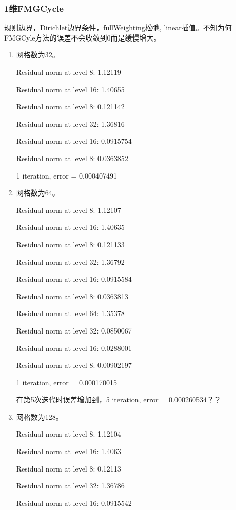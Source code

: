 \documentclass[UTF8]{ctexart}
\begin{document}
\subsubsection*{1维FMGCycle}
规则边界，Dirichlet边界条件，fullWeighting松弛, linear插值。不知为何FMGCyle方法的误差不会收敛到0而是缓慢增大。
\begin{enumerate}
\item 网格数为32。

    Residual norm at level 8: 1.12119

    Residual norm at level 16: 1.40655

    Residual norm at level 8: 0.121142

    Residual norm at level 32: 1.36816

    Residual norm at level 16: 0.0915754

    Residual norm at level 8: 0.0363852

    1 iteration, error = 0.000407491

\item 网格数为64。

    Residual norm at level 8: 1.12107

    Residual norm at level 16: 1.40635

    Residual norm at level 8: 0.121133
    
    Residual norm at level 32: 1.36792

    Residual norm at level 16: 0.0915584

    Residual norm at level 8: 0.0363813

    Residual norm at level 64: 1.35378

    Residual norm at level 32: 0.0850067

    Residual norm at level 16: 0.0288001

    Residual norm at level 8: 0.00902197

    1 iteration, error = 0.000170015
    
    在第5次迭代时误差增加到，5 iteration, error = 0.000260534？？

\item 网格数为128。

    Residual norm at level 8: 1.12104

    Residual norm at level 16: 1.4063

    Residual norm at level 8: 0.12113

    Residual norm at level 32: 1.36786

    Residual norm at level 16: 0.0915542


\end{enumerate}
\end{document}

